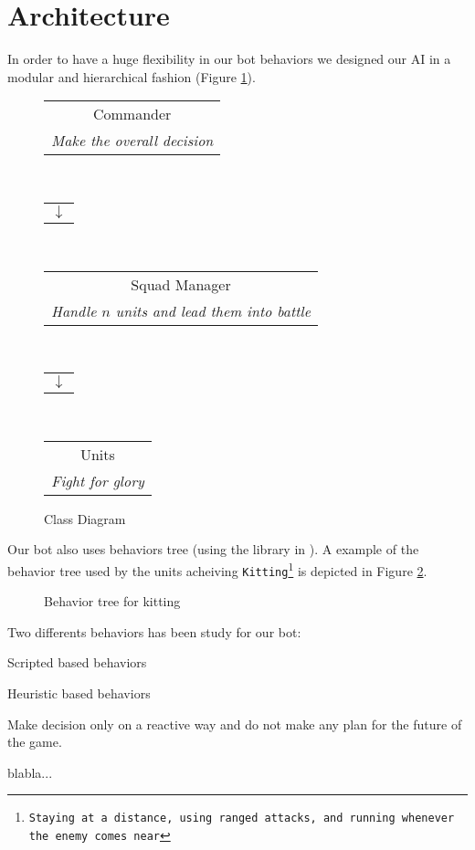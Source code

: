 \section{Architecture}

In order to have a huge flexibility in our bot behaviors we designed our AI in a modular and hierarchical fashion (Figure \ref{classDiag}).


\begin{figure}[h!b]
\centering
\begin{tabular}{|c|}
\hline
Commander \\
\emph{Make the overall decision} \\
\hline
\end{tabular} \ \\
\begin{tabular}{c}
$\downarrow$
\end{tabular} \ \\
\begin{tabular}{|c|}
\hline
Squad Manager \\
\emph{Handle $n$ units and lead them into battle} \\
\hline
\end{tabular} \ \\
\begin{tabular}{c}
$\downarrow$
\end{tabular} \ \\
\begin{tabular}{|c|}
\hline
Units \\
\emph{Fight for glory} \\
\hline
\end{tabular}
\caption{Class Diagram}
\label{classDiag}
\end{figure}

Our bot also uses behaviors tree (using the library in \cite{libbehavior}). A example of the behavior tree used by the units acheiving \texttt{Kitting\footnote{Staying at a distance, using ranged attacks, and running whenever the enemy comes near}} is depicted in Figure \ref{behaAttackClos}.

\begin{figure}[h!b]
\caption{Behavior tree for kitting}
\label{behaAttackClos}
\end{figure}

Two differents behaviors has been study for our bot:
\begin{shortitem}
\item Scripted based behaviors
\item Heuristic based behaviors
\end{shortitem}

\begin{definition}
Make decision only on a reactive way and do not make any plan for the future of the game.
\end{definition}

\begin{definition}
blabla...
\end{definition}
